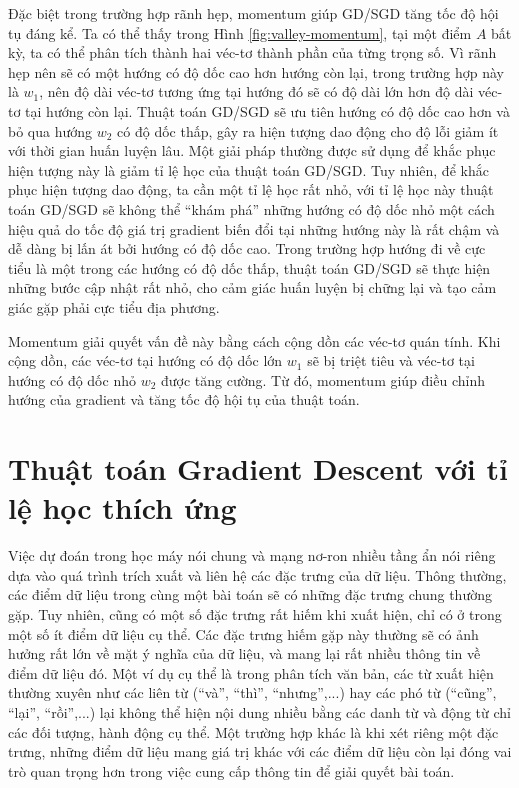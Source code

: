 Đặc biệt trong trường hợp rãnh hẹp, momentum giúp GD/SGD tăng tốc độ hội tụ đáng kể. Ta có thể thấy trong Hình \ref{fig:valley-momentum}, tại một điểm $A$ bất kỳ, ta có thể phân tích thành hai véc-tơ thành phần của từng trọng số. Vì rãnh hẹp nên sẽ có một hướng có độ dốc cao hơn hướng còn lại, trong trường hợp này là $w_1$, nên độ dài véc-tơ tương ứng tại hướng đó sẽ có độ dài lớn hơn độ dài véc-tơ tại hướng còn lại. Thuật toán GD/SGD sẽ ưu tiên hướng có độ dốc cao hơn và bỏ qua hướng $w_2$ có độ dốc thấp, gây ra hiện tượng dao động cho độ lỗi giảm ít với thời gian huấn luyện lâu. Một giải pháp thường được sử dụng để khắc phục hiện tượng này là giảm tỉ lệ học của thuật toán GD/SGD. Tuy nhiên, để khắc phục hiện tượng dao động, ta cần một tỉ lệ học rất nhỏ, với tỉ lệ học này thuật toán GD/SGD sẽ không thể ``khám phá'' những hướng có độ dốc nhỏ một cách hiệu quả do tốc độ giá trị gradient biến đổi tại những hướng này là rất chậm và dễ dàng bị lấn át bởi hướng có độ dốc cao. Trong trường hợp hướng đi về cực tiểu là một trong các hướng có độ dốc thấp, thuật toán GD/SGD sẽ thực hiện những bước cập nhật rất nhỏ, cho cảm giác huấn luyện bị chững lại và tạo cảm giác gặp phải cực tiểu địa phương.

Momentum giải quyết vấn đề này bằng cách cộng dồn các véc-tơ quán tính. Khi cộng dồn, các véc-tơ tại hướng có độ dốc lớn $w_1$ sẽ bị triệt tiêu và véc-tơ tại hướng có độ dốc nhỏ $w_2$ được tăng cường. Từ đó, momentum giúp điều chỉnh hướng của gradient và tăng tốc độ hội tụ của thuật toán.

\section{Thuật toán Gradient Descent với tỉ lệ học thích ứng}

Việc dự đoán trong học máy nói chung và mạng nơ-ron nhiều tầng ẩn nói riêng dựa vào quá trình trích xuất và liên hệ các đặc trưng của dữ liệu. Thông thường, các điểm dữ liệu trong cùng một bài toán sẽ có những đặc trưng chung thường gặp. Tuy nhiên, cũng có một số đặc trưng rất hiếm khi xuất hiện, chỉ có ở trong một số ít điểm dữ liệu cụ thể. Các đặc trưng hiếm gặp này thường sẽ có ảnh hưởng rất lớn về mặt ý nghĩa của dữ liệu, và mang lại rất nhiều thông tin về điểm dữ liệu đó\cite{salton1988term}. Một ví dụ cụ thể là trong phân tích văn bản, các từ xuất hiện thường xuyên như các liên từ (``và'', ``thì'', ``nhưng'',...) hay các phó từ (``cũng'', ``lại'', ``rồi'',...) lại không thể hiện nội dung nhiều bằng các danh từ và động từ chỉ các đối tượng, hành động cụ thể. Một trường hợp khác là khi xét riêng một đặc trưng, những điểm dữ liệu mang giá trị khác với các điểm dữ liệu còn lại đóng vai trò quan trọng hơn trong việc cung cấp thông tin để giải quyết bài toán.


